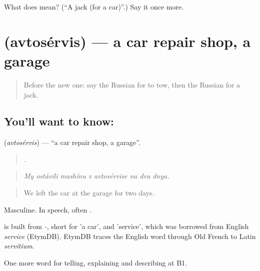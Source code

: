 \begin{tcolorbox}[breakable,colback=teal!4,colframe=teal!35!black,title={Before you move on}]
What does  mean? (\textquotedblleft{}A jack (for a car)\textquotedblright{}.) Say it once more.
\end{tcolorbox}
\section[\texorpdfstring{\ru{автосервис} (avtosérvis)}{автосервис (avtosérvis)}]{ (avtosérvis) — a car repair shop, a garage}

\label{lesson:RU-C409-avtoservis}



\begin{quote}
Before the new one: say the Russian for to tow, then the Russian for a jack.
\end{quote}

\subsection*{You'll want to know: }
\textbf{} (\emph{avtosérvis}) — \textquotedblleft{}a car repair shop, a garage\textquotedblright{}.

\begin{quote}
       .
\end{quote}

\begin{quote}
\emph{My ostávili mashínu v avtosérvise na dva dnya.}
\end{quote}

\begin{quote}
We left the car at the garage for two days.
\end{quote}

Masculine. In speech, often \emph{}.

\begin{cousinweb}
\emph{} is built from \emph{-}, short for \emph{} 'a car', and \emph{} 'service', which was borrowed from English \emph{service} (EtymDB). EtymDB traces the English word through Old French to Latin \emph{servitium}.
\end{cousinweb}

\begin{grammarlens}[title={What you've built}]
One more word for telling, explaining and describing at B1.
\end{grammarlens}


